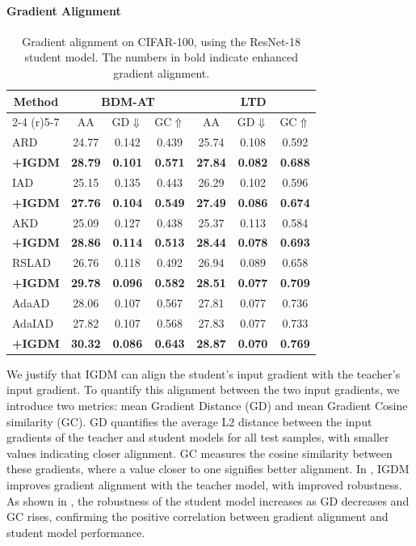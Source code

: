 \documentclass{article} %
\begin{document}
\paragraph{Gradient Alignment}
\begin{table}
\vspace{-0.5cm}
\caption{Gradient alignment on CIFAR-100, using the ResNet-18 student model. 
The numbers in bold indicate enhanced gradient alignment.}
 \centering
 \setlength{\tabcolsep}{3pt}
 \begin{tabular}{lcccccc}
 \toprule
     \multicolumn{1}{c}{\multirow{2.5}{*}{Method}} &  \multicolumn{3}{c}{BDM-AT}&\multicolumn{3}{c}{LTD}\\

     \cmidrule(r){2-4} \cmidrule(r){5-7}  &AA& GD$\Downarrow$& GC$\Uparrow$ &AA& GD$\Downarrow$& GC$\Uparrow$\\ 
\midrule
 ARD  &24.77 &0.142&0.439&25.74 & 0.108& 0.592\\
\textbf{+IGDM}  &\textbf{28.79} &\textbf{0.101}&\textbf{0.571}&\textbf{27.84} & \textbf{0.082}& \textbf{0.688}\\
 \midrule
 IAD  &25.15 &0.135&0.443&26.29 & 0.102& 0.596\\
\textbf{+IGDM}   &\textbf{27.76} &\textbf{0.104}&\textbf{0.549}&\textbf{27.49} & \textbf{0.086}& \textbf{0.674}\\
 \midrule
 AKD &25.09 & 0.127 & 0.438 &25.37& 0.113& 0.584\\
 \textbf{+IGDM}   &\textbf{28.86}& \textbf{0.114} & \textbf{0.513}&\textbf{28.44}& \textbf{0.078}& \textbf{0.693}\\
 \midrule
 RSLAD  &26.76 &0.118&0.492&26.94 & 0.089& 0.658\\
\textbf{+IGDM}  &\textbf{29.78} &\textbf{0.096}&\textbf{0.582}&\textbf{28.51} & \textbf{0.077} & \textbf{0.709} \\
  \midrule
 AdaAD  &28.06 &0.107&0.567&27.81 & 0.077& 0.736\\
 AdaIAD &27.82& 0.107& 0.568&27.83 & 0.077 &0.733\\
\textbf{+IGDM}  &\textbf{30.32} &\textbf{0.086} &\textbf{0.643} &\textbf{28.87} &  \textbf{0.070} & \textbf{0.769} \\
 \bottomrule
 \end{tabular}
 \label{tab:gd_gc}
 \vspace{-0.5cm}
\end{table}
We justify that IGDM can align the student's input gradient with the teacher's input gradient.
To quantify this alignment between the two input gradients, we introduce two metrics: mean Gradient Distance (GD) and mean Gradient Cosine similarity (GC). 
GD quantifies the average L2 distance between the input gradients of the teacher and student models for all test samples, with smaller values indicating closer alignment. GC measures the cosine similarity between these gradients, where a value closer to one signifies better alignment.
In , IGDM improves gradient alignment with the teacher model, with improved robustness. 
As shown in , the robustness of the student model increases as GD decreases and GC rises, confirming the positive correlation between gradient alignment and student model performance. 
\end{document}
